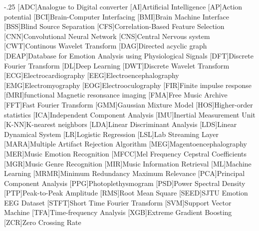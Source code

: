 \documentclass[headsepline,footsepline,footinclude=false,oneside,fontsize=11pt,paper=a4,listof=totoc,bibliography=totoc]{scrbook} %
\begin{document}
\begin{acronym}
	\itemsep-.25\baselineskip
	  [ADC]{Analogue to Digital converter}
    [AI]{Artificial Intelligence} %
    [AP]{Action potential}
    [BCI]{Brain-Computer Interfacing}
    [BMI]{Brain Machine Interface}
    [BSS]{Blind Source Separation}
    [CFS]{Correlation-Based Feature Selection}
    [CNN]{Convolutional Neural Network}
    [CNS]{Central Nervous system}
    [CWT]{Continous Wavelet Transform}
    [DAG]{Directed acyclic graph}
    [DEAP]{Database for Emotion Analysis using Physiological Signals}
    [DFT]{Discrete Fourier Transform}
    [DL]{Deep Learning}
    [DWT]{Discrete Wavelet Transform}
    [ECG]{Electrocardiography}
    [EEG]{Electroencephalography}
    [EMG]{Electromyography}
    [EOG]{Electrooculography}
    [FIR]{Finite impulse response}
    [fMRI]{functional Magnetic resonsance imaging}
    [FMA]{Free Music Archive}
    [FFT]{Fast Fourier Transform}
    [GMM]{Gaussian Mixture Model}
    [HOS]{Higher-order statistics}
    [ICA]{Independent Component Analysis}
    [IMU]{Inertial Measurement Unit}
    [K-NN]{K-nearest neighbors}
    [LDA]{Linear Discriminant Analysis}
    [LDS]{Linear Dynamical System}
    [LR]{Logistic Regression}
    [LSL]{Lab Streaming Layer}
    [MARA]{Multiple Artifact Rejection Algorithm}
    [MEG]{Magentoencephalography}
    [MER]{Music Emotion Recognition}
    [MFCC]{Mel Frequency Cepstral Coefficients}
    [MGR]{Music Genre Recognition}
    [MIR]{Music Information Retrieval}
		[ML]{Machine Learning}
    [MRMR]{Minimum Redundancy Maximum Relevance}
    [PCA]{Principal Component Analysis}
    [PPG]{Photoplethysmogram}
    [PSD]{Power Spectral Density}
    [PTP]{Peak-to-Peak Amplitude}
    [RMS]{Root Mean Square}
    [SEED]{SJTU Emotion EEG Dataset}
    [STFT]{Short Time Fourier Transform}
    [SVM]{Support Vector Machine}
    [TFA]{Time-frequency Analysis}
    [XGB]{Extreme Gradient Boosting}
    [ZCR]{Zero Crossing Rate}
\end{acronym}

\listoffigures{}
\listoftables{}
\printbibliography{}
\end{document}
